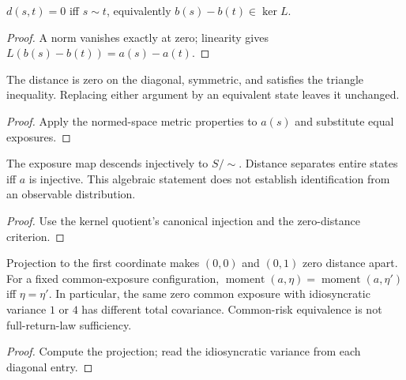 \begin{lemma}\label{thm:risk-kernel}
  \leanok
  $d(s,t)=0$ iff $s\sim t$, equivalently $b(s)-b(t)\in\ker L$.
\end{lemma}
\begin{proof}\leanok
  A norm vanishes exactly at zero; linearity gives
  $L(b(s)-b(t))=a(s)-a(t)$.
\end{proof}

\begin{lemma}\label{thm:risk-representatives}
  \leanok
  The distance is zero on the diagonal, symmetric, and satisfies the triangle
  inequality. Replacing either argument by an equivalent state leaves
  it unchanged.
\end{lemma}
\begin{proof}\leanok
  Apply the normed-space metric properties to $a(s)$ and substitute
  equal exposures.
\end{proof}

\begin{lemma}\label{thm:risk-quotient}
  \leanok
  The exposure map descends injectively to $S/{\sim}$. Distance separates
  entire states iff $a$ is injective. This algebraic statement does not
  establish identification from an observable distribution.
\end{lemma}
\begin{proof}\leanok
  Use the kernel quotient's canonical injection and the zero-distance criterion.
\end{proof}

\begin{lemma}\label{thm:risk-boundaries}
  \leanok
  Projection to the first coordinate makes $(0,0)$ and $(0,1)$ zero distance
  apart. For a fixed common-exposure configuration,
  $\operatorname{moment}(a,\eta)
  =\operatorname{moment}(a,\eta')$ iff $\eta=\eta'$. In particular, the same
  zero common exposure with idiosyncratic variance $1$ or $4$ has different
  total covariance. Common-risk equivalence is not full-return-law sufficiency.
\end{lemma}
\begin{proof}\leanok
  Compute the projection; read the idiosyncratic variance from each
  diagonal entry.
\end{proof}

